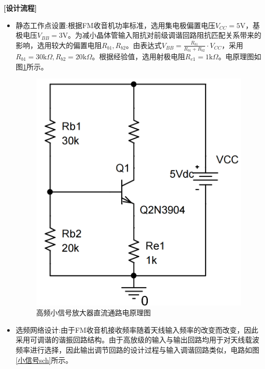 \documentclass[a4paper,12pt,twoside]{article}
\begin{document}
\textbf{[设计流程]}
\begin{itemize}
    \item 静态工作点设置:根据FM收音机功率标准，选用集电极偏置电压$V_{CC}=5\mathrm{V}$，基极电压$V_{BB}=3\mathrm{V}$。为减小晶体管输入阻抗对前级调谐回路阻抗匹配关系带来的影响，选用较大的偏置电阻$R_{b1},R_{b2}$。由表达式$V_{BB}=\frac{R_{b1}}{R_{b1}+R_{b2}}\cdot V_{CC}$，采用$R_{b1}=30\mathrm{k}\Omega,R_{b2}=20\mathrm{k}\Omega$。根据经验值，选用射极电阻$R_{e1}=1\mathrm{k}\Omega$。电原理图如图\ref{直流}所示。
    \begin{figure}[H]
        \centering
        \includegraphics[scale=0.13]{直流通路.png}
        \caption{高频小信号放大器直流通路电原理图}
        \label{直流}
    \end{figure}
    \item 选频网络设计:由于FM收音机接收频率随着天线输入频率的改变而改变，因此采用可调谐的谐振回路结构。由于高放级的输入与输出回路均用于对天线载波频率进行选择，因此输出调节回路的设计过程与输入调谐回路类似，电路如图\ref{小信号sch}所示。
    

\end{itemize}
\end{document}
